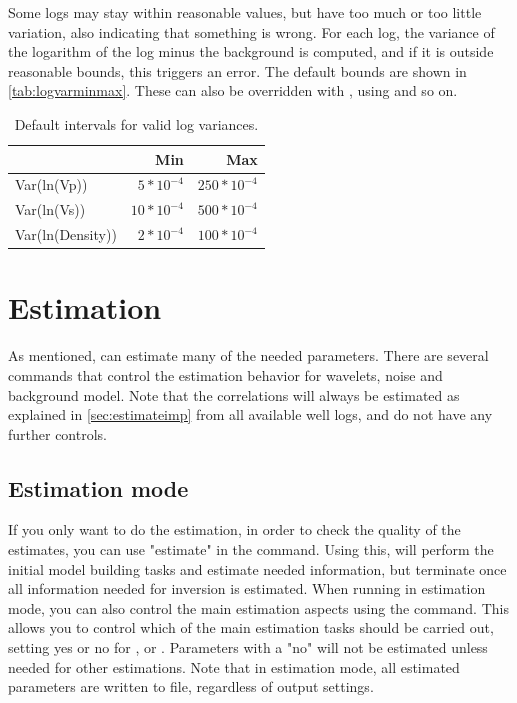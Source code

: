Some logs may stay within reasonable values, but have too much or too little variation, also indicating that something is wrong. For each log, the variance of the logarithm of the log minus the background is computed, and if it is outside reasonable bounds, this triggers an error. The default bounds are shown in \autoref{tab:logvarminmax}. These can also be overridden with , using  and so on.
\begin{table}
\begin{tabular}{|lrr|}
\hline
& Min & Max \\
\hline
Var(ln(Vp)) & $5*10^{-4}$ & $250*10^{-4}$ \\
Var(ln(Vs)) & $10*10^{-4}$ & $500*10^{-4}$ \\
Var(ln(Density)) & $2*10^{-4}$ & $100*10^{-4}$ \\
\end{tabular}
\caption{Default intervals for valid log variances.\label{tab:logvarminmax}}
\end{table}

\section{Estimation}
\label{sec:estimateusr}
As mentioned, \crava can estimate many of the needed parameters. There are several commands that control the estimation behavior for wavelets, noise and background model. Note that the correlations will always be estimated as explained in \autoref{sec:estimateimp} from all available well logs, and do not have any further controls.

\subsection{Estimation mode}
If you only want to do the estimation, in order to check the quality of the estimates, you can use "estimate" in the  command. Using this, \crava will perform the initial model building tasks and estimate needed information, but terminate once all information needed for inversion is estimated. When running in estimation mode, you can also control the main estimation aspects using the  command. This allows you to control which of the main estimation tasks should be carried out, setting yes or no for ,  or . Parameters with a "no" will not be estimated unless needed for other estimations. Note that in estimation mode, all estimated parameters are written to file, regardless of output settings.
